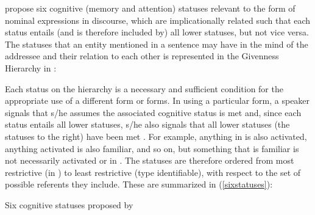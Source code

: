 \citet{gundel1993} propose six cognitive (memory and attention) statuses relevant to the form of nominal expressions in discourse, which are implicationally related such that each status entails (and is therefore included by) all lower statuses, but not vice versa. The statuses that an entity mentioned in a sentence may have in the mind of the addressee and their relation to each other is represented in the Givenness Hierarchy in :

\begin{table} 

\caption{{Givenness Hierarchy (Gundel et. al.1993)}}
\label{givennesshierarchy} 

\end{table}
Each status on the hierarchy is a necessary and sufficient condition for the appropriate use of a different form or forms. In using a particular form, a speaker signals that s/he assumes the associated cognitive status is met and, since each status entails all lower statuses, s/he also signals that all lower statuses (the statuses to the right) have been met \citep[275]{gundel1993}. For example, anything in  is also activated, anything activated is also familiar, and so on, but something that is familiar is not necessarily activated or in . The statuses are therefore ordered from most restrictive (in ) to least restrictive (type identifiable), with respect to the set of possible referents they include. These are summarized in (\ref{sixstatuses}):

\ea\label{sixstatuses} Six cognitive statuses proposed by \citet{gundel1993}


